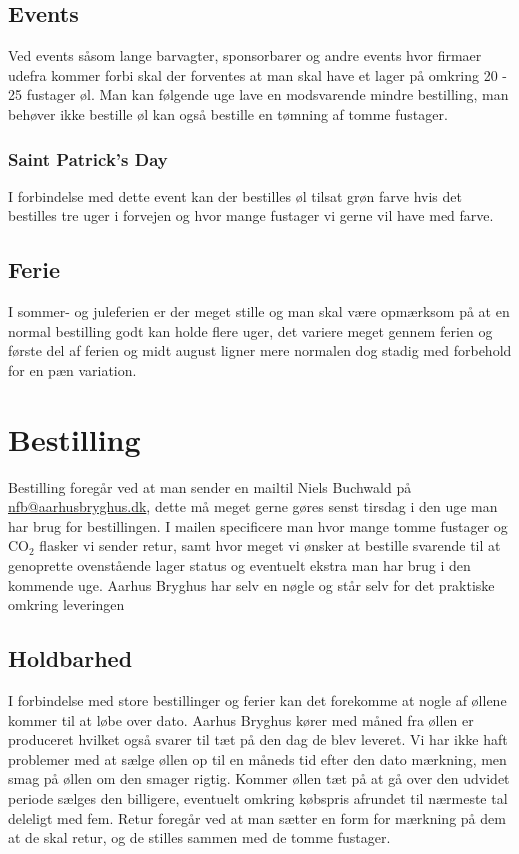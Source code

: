 \subsection{Events}

Ved events såsom lange barvagter, sponsorbarer og andre events hvor firmaer udefra kommer forbi skal der forventes
at man skal have et lager på omkring 20 - 25 fustager øl. Man kan følgende uge lave en modsvarende mindre bestilling,
man behøver ikke bestille øl kan også bestille en tømning af tomme fustager.

\subsubsection{Saint Patrick's Day}

I forbindelse med dette event kan der bestilles øl tilsat grøn farve hvis det bestilles tre uger i forvejen og hvor mange
fustager vi gerne vil have med farve.

\subsection{Ferie}

I sommer- og juleferien er der meget stille og man skal være opmærksom på at en normal bestilling
godt kan holde flere uger, det variere meget gennem ferien og første del af ferien og
midt august ligner mere normalen dog stadig med forbehold for en pæn variation.


\section{Bestilling}

Bestilling foregår ved at man sender en mailtil Niels Buchwald på \\
\href{mailto:nfb@aarhusbryghus.dk}{nfb@aarhusbryghus.dk}, dette må meget gerne gøres senst tirsdag i den uge man har brug for bestillingen.
I mailen specificere man hvor mange tomme fustager og CO$_{2}$ flasker vi sender retur, samt hvor meget vi ønsker at bestille
svarende til at genoprette ovenstående lager status og eventuelt ekstra man har brug i den kommende uge.
Aarhus Bryghus har selv en nøgle og står selv for det praktiske omkring leveringen

\subsection{Holdbarhed}

I forbindelse med store bestillinger og ferier kan det forekomme at nogle af øllene kommer til at løbe over dato.
Aarhus Bryghus kører med måned fra øllen er produceret hvilket også svarer til tæt på den dag de blev leveret.
Vi har ikke haft problemer med at sælge øllen op til en måneds tid efter den dato mærkning, men smag på øllen
om den smager rigtig. Kommer øllen tæt på at gå over den udvidet periode sælges den billigere,
eventuelt omkring købspris afrundet til nærmeste tal deleligt med fem.
Retur foregår ved at man sætter en form for mærkning på dem at de skal retur, og de stilles sammen
med de tomme fustager.


